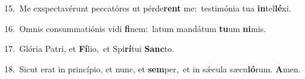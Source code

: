 {\numbfont\textcolor{\numbcolor}{15.}}~Me exspectavérunt peccatóres ut pérde\textbf{rent} me:~\star testimónia tua \textbf{in}\-tel\-\textbf{lé}\-xi.\par
{\numbfont\textcolor{\numbcolor}{16.}}~Omnis consummatiónis vidi \textbf{fi}\-nem:~\star latum mandátum \textbf{tu}\-um \textbf{ni}\-mis.\par
{\numbfont\textcolor{\numbcolor}{17.}}~Glória Patri, et \textbf{Fí}\-lio,~\star et Spi\-\textbf{rí}\-tui \textbf{Sanc}\-to.\par
{\numbfont\textcolor{\numbcolor}{18.}}~Sicut erat in princípio, et nunc, et \textbf{sem}\-per,~\star et in sǽcula sæcu\-\textbf{ló}\-rum. \textbf{A}\-men.\par
